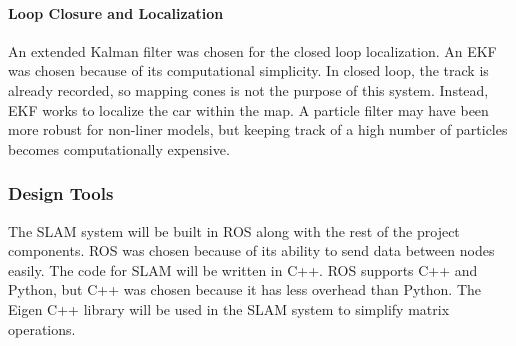 \documentclass[10pt, onecolumn, draftclsnofoot, letterpaper,compsoc]{IEEEtran}
\begin{document}
\paragraph{Loop Closure and Localization}
An extended Kalman filter was chosen for the closed loop localization. An EKF was chosen because of its computational simplicity. In closed loop, the track is already recorded, so mapping cones is not the purpose of this system. Instead, EKF works to localize the car within the map. A particle filter may have been more robust for non-liner models, but keeping track of a high number of particles becomes computationally expensive.

\subsubsection{Design Tools} %
The SLAM system will be built in ROS along with the rest of the project components. ROS was chosen because of its ability to send data between nodes easily. The code for SLAM will be written in C++. ROS supports C++ and Python, but C++ was chosen because it has less overhead than Python. The Eigen C++ library will be used in the SLAM system to simplify matrix operations.

\nocite{*}

\end{document}
